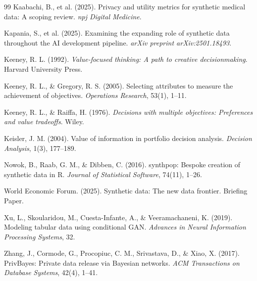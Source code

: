 \documentclass[12pt,a4paper]{article}
\begin{document}
\begin{thebibliography}{99}
Kaabachi, B., et al. (2025).
Privacy and utility metrics for synthetic medical data: A scoping review.
\textit{npj Digital Medicine}.

Kapania, S., et al. (2025).
Examining the expanding role of synthetic data throughout the AI development pipeline.
\textit{arXiv preprint arXiv:2501.18493}.

Keeney, R. L. (1992).
\textit{Value-focused thinking: A path to creative decisionmaking}.
Harvard University Press.

Keeney, R. L., \& Gregory, R. S. (2005).
Selecting attributes to measure the achievement of objectives.
\textit{Operations Research}, 53(1), 1--11.

Keeney, R. L., \& Raiffa, H. (1976).
\textit{Decisions with multiple objectives: Preferences and value tradeoffs}.
Wiley.

Keisler, J. M. (2004).
Value of information in portfolio decision analysis.
\textit{Decision Analysis}, 1(3), 177--189.

Nowok, B., Raab, G. M., \& Dibben, C. (2016).
synthpop: Bespoke creation of synthetic data in R.
\textit{Journal of Statistical Software}, 74(11), 1--26.

World Economic Forum. (2025).
Synthetic data: The new data frontier.
Briefing Paper.

Xu, L., Skoularidou, M., Cuesta-Infante, A., \& Veeramachaneni, K. (2019).
Modeling tabular data using conditional GAN.
\textit{Advances in Neural Information Processing Systems}, 32.

Zhang, J., Cormode, G., Procopiuc, C. M., Srivastava, D., \& Xiao, X. (2017).
PrivBayes: Private data release via Bayesian networks.
\textit{ACM Transactions on Database Systems}, 42(4), 1--41.

\end{thebibliography}
\end{document}
